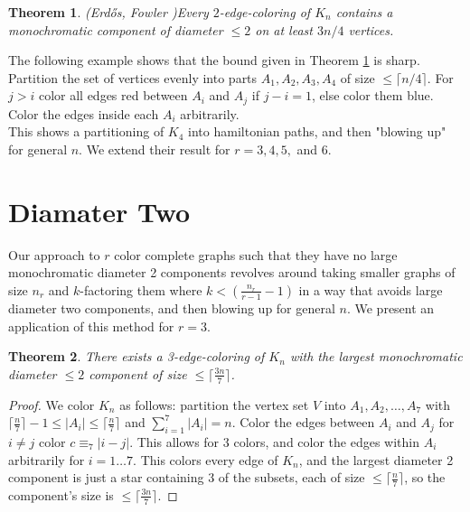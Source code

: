\documentclass{article}
\newtheorem{theorem}{Theorem}
\begin{document}
	\begin{theorem} (Erd\H os, Fowler \cite{EF})\label{EF1}
		Every $2$-edge-coloring of $K_n$ contains a
		monochromatic component of diameter $\le 2$ on at least $3n/4$ vertices.
	\end{theorem}
	The following example shows that the bound given in Theorem \ref{EF1} is sharp.
	Partition the set of vertices evenly into parts $A_1,A_2,A_3,A_4$ of size $\le \lceil n/4\rceil$.
	For $j>i$ color all edges red between $A_i$ and $A_j$ if $j-i=1$, else color them blue.
	Color the edges inside each $A_i$ arbitrarily.\\
	This shows a partitioning of $ K_4 $ into hamiltonian paths, and then "blowing up" for general $ n $. We extend their result for $ r=3,4,5, $ and $ 6 $.
	
	\section{Diamater Two}
	Our approach to $ r $ color complete graphs such that they have no large monochromatic diameter 2 components revolves around taking smaller graphs of size $ n_r $ and $ k $-factoring them where $ k<(\frac{n_r}{r-1}-1) $ in a way that avoids large diameter two components, and then blowing up for general $ n $. We present an application of this method for $ r=3 $.
	
	
	\begin{theorem}
		There exists a 3-edge-coloring of $ K_n $ with the largest monochromatic diameter $ \le 2 $ component of size $ \le \lceil \frac{3n}{7} \rceil $.
	\end{theorem}

	\begin{proof}
		We color $ K_n $ as follows: partition the vertex set $ V $ into $ A_1,A_2,\ldots,A_7 $ with $ \lceil\frac{n}{7}\rceil-1\le |A_i| \le \lceil \frac{n}{7} \rceil $ and $ \sum_{i=1}^{7}|A_i|=n $. Color the edges between $ A_i $ and $ A_j $ for $ i\neq j $ color $ c\equiv_7 |i-j| $. This allows for 3 colors, and color the edges within $ A_i $ arbitrarily for $ i=1\ldots 7 $. This colors every edge of $ K_n $, and the largest diameter 2 component is just a star containing 3 of the subsets, each of size $ \le \lceil \frac{n}{7} \rceil $, so the component's size is $ \le \lceil \frac{3n}{7} \rceil $.
	\end{proof}
	
\end{document}
